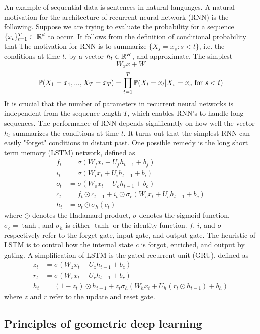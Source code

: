 \documentclass{article}
\begin{document}
An example of sequential data is sentences in natural languages.
A natural motivation for the architecture of recurrent neural network (RNN) is the following.
Suppose we are trying to evaluate the probability for a sequence $\{x_t\}_{t = 1}^T \subset {\mathbb R}^d$ to occur.
It follows from the definition of conditional probability that
The motivation for RNN is to summarize $\{X_s = x_s : s < t\}$, i.e. the conditions at time $t$, by a vector $h_t \in {\mathbb R}^H$, and approximate.
The simplest
\[
W_x x + W
\]
\[
{\mathbb P} (X_1 = x_1, ..., X_T = x_T)
= \prod_{t = 1}^T {\mathbb P} (X_t = x_t | X_s = x_s\ \text{for}\ s < t)
\]
It is crucial that the number of parameters in recurrent neural networks is independent from the sequence length $T$, which enables RNN's to handle long sequences.
The performance of RNN depends significantly on how well the vector $h_t$ summarizes the conditions at time $t$.
It turns out that the simplest RNN can easily "forget" conditions in distant past.
One possible remedy is the long short term memory (LSTM) network, defined as
\begin{align*}
f_t & = \sigma (W_f x_t + U_f h_{t - 1} + b_f) \\
i_t & = \sigma (W_i x_t + U_i h_{t - 1} + b_i) \\
o_t & = \sigma (W_o x_t + U_o h_{t - 1} + b_o) \\
c_t & = f_t \odot c_{t - 1} + i_t \odot \sigma_c (W_c x_t + U_c h_{t - 1} + b_c) \\
h_t & = o_t \odot \sigma_h (c_t)
\end{align*}
where $\odot$ denotes the Hadamard product, $\sigma$ denotes the sigmoid function, $\sigma_c = \tanh$, and $\sigma_h$ is either $\tanh$ or the identity function.
$f$, $i$, and $o$ respectively refer to the forget gate, input gate, and output gate.
The heuristic of LSTM is to control how the internal state $c$ is forgot, enriched, and output by gating.
A simplification of LSTM is the gated recurrent unit (GRU), defined as
\begin{align*}
z_t & = \sigma (W_z x_t + U_z h_{t - 1} + b_z) \\
r_t & = \sigma (W_r x_t + U_r h_{t - 1} + b_r) \\
h_t & = (1 - z_t) \odot h_{t - 1} + z_t \sigma_h (W_h x_t + U_h (r_t \odot h_{t - 1}) + b_h)
\end{align*}
where $z$ and $r$ refer to the update and reset gate.

\subsection{Principles of geometric deep learning}
\end{document}
